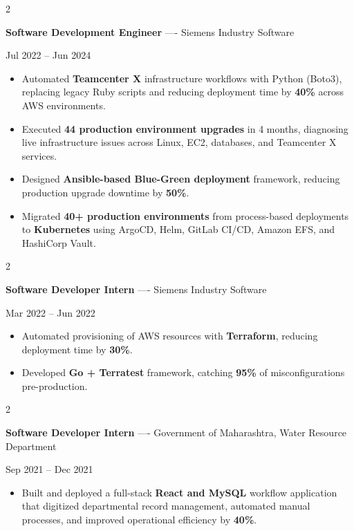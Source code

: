 \documentclass[10pt, letterpaper]{article}
\newenvironment{highlights}{
    \begin{itemize}[
        topsep=0.10 cm,
        parsep=0.06 cm,
        partopsep=0pt,
        itemsep=0.06 cm,
        leftmargin=12pt
    ]
}{
    \end{itemize}
}
\newenvironment{twocolentry}[2][]{
    \onecolentry
    \def\secondColumn{#2}
    \setcolumnwidth{\fill, 4.5 cm}
    \begin{paracol}{2}
}{
    \switchcolumn \raggedleft \secondColumn
    \end{paracol}
    \endonecolentry
}
\begin{document}
\vspace{0.15 cm}

\begin{twocolentry}{Jul 2022 -- Jun 2024}
\textbf{Software Development Engineer} ---- Siemens Industry Software
\end{twocolentry}
\begin{highlights}
  \item Automated \textbf{Teamcenter X} infrastructure workflows with Python (Boto3), replacing legacy Ruby scripts and reducing deployment time by \textbf{40\%} across AWS environments.
  \item Executed \textbf{44 production environment upgrades} in 4 months, diagnosing live infrastructure issues across Linux, EC2, databases, and Teamcenter X services.
  \item Designed \textbf{Ansible-based Blue-Green deployment} framework, reducing production upgrade downtime by \textbf{50\%}.
  \item Migrated \textbf{40+ production environments} from process-based deployments to \textbf{Kubernetes} using ArgoCD, Helm, GitLab CI/CD, Amazon EFS, and HashiCorp Vault.
\end{highlights}

\vspace{0.15 cm}

\begin{twocolentry}{Mar 2022 -- Jun 2022}
\textbf{Software Developer Intern} ---- Siemens Industry Software
\end{twocolentry}
\begin{highlights}
  \item Automated provisioning of AWS resources with \textbf{Terraform}, reducing deployment time by \textbf{30\%}.
  \item Developed \textbf{Go + Terratest} framework, catching \textbf{95\%} of misconfigurations pre-production.
\end{highlights}

\vspace{0.15 cm}

\begin{twocolentry}{Sep 2021 -- Dec 2021}
\textbf{Software Developer Intern} ---- Government of Maharashtra, Water Resource Department
\end{twocolentry}
\begin{highlights}
  \item Built and deployed a full-stack \textbf{React and MySQL} workflow application that digitized departmental record management, automated manual processes, and improved operational efficiency by \textbf{40\%}.
\end{highlights}
\end{document}
